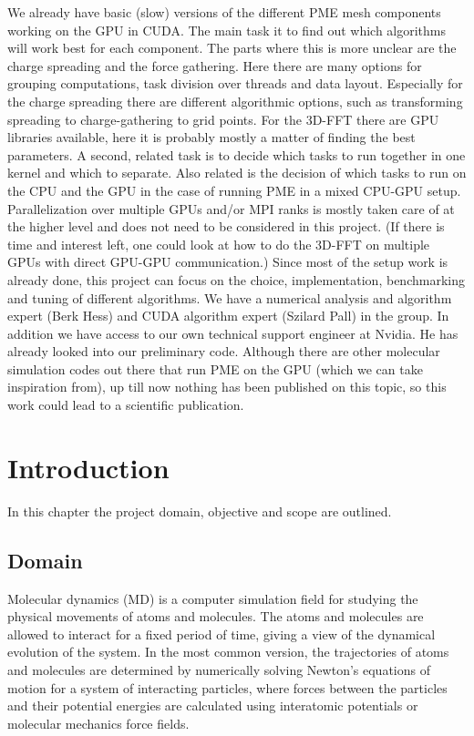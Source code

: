 \documentclass[12pt,a4paper,notitlepage]{report}
\begin{document}
We already have basic (slow) versions of the different PME mesh components working on the GPU in CUDA. The main task it to find out which algorithms will work best for each component. The parts where this is more unclear are the charge spreading and the force gathering. Here there are many options for grouping computations, task division over threads and data layout. Especially for the charge spreading there are different algorithmic options, such as transforming spreading to charge-gathering to grid points. For the 3D-FFT there are GPU libraries available, here it is probably mostly a matter of finding the best parameters. A second, related task is to decide which tasks to run together in one kernel and which to separate. Also related is the decision of which tasks to run on the CPU and the GPU in the case of running PME in a mixed CPU-GPU setup. Parallelization over multiple GPUs and/or MPI ranks is mostly taken care of at the higher level and does not need to be considered in this project. (If there is time and interest left, one could look at how to do the 3D-FFT on multiple GPUs with direct GPU-GPU communication.) Since most of the setup work is already done, this project can focus on the choice, implementation, benchmarking and tuning of different algorithms. We have a numerical analysis and algorithm expert (Berk Hess) and CUDA algorithm expert (Szilard Pall) in the group. In addition we have access to our own technical support engineer at Nvidia. He has already looked into our preliminary code. Although there are other molecular simulation codes out there that run PME on the GPU (which we can take inspiration from), up till now nothing has been published on this topic, so this work could lead to a scientific publication.


\fi





\newpage
\chapter{Introduction}

In this chapter the project domain, objective and scope are outlined.

\section{Domain}

Molecular dynamics (MD) is a computer simulation field for studying the physical movements of atoms and molecules. The atoms and molecules are allowed to interact for a fixed period of time, giving a view of the dynamical evolution of the system. In the most common version, the trajectories of atoms and molecules are determined by numerically solving Newton's equations of motion for a system of interacting particles, where forces between the particles and their potential energies are calculated using interatomic potentials or molecular mechanics force fields. 
\end{document}
